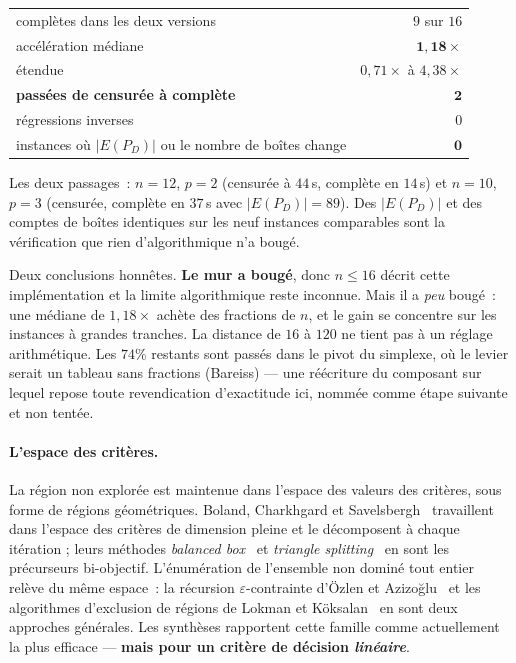 \documentclass[12pt,a4paper]{report}
\newcommand{\E}{E(P_D)}
\theoremstyle{plain}
\theoremstyle{definition}
\begin{document}
\begin{center}
\begin{tabular}{lr}
\toprule
complètes dans les deux versions                 & $9$ sur $16$ \\
\quad accélération médiane                       & $\mathbf{1{,}18\times}$ \\
\quad étendue                                    & $0{,}71\times$ à $4{,}38\times$ \\
\midrule
\textbf{passées de censurée à complète}          & $\mathbf{2}$ \\
régressions inverses                             & $0$ \\
\midrule
instances où $|\E|$ ou le nombre de boîtes change & $\mathbf{0}$ \\
\bottomrule
\end{tabular}
\end{center}

\noindent
Les deux passages~: $n{=}12$, $p{=}2$ (censurée à $44$\,s, complète en
$14$\,s) et $n{=}10$, $p{=}3$ (censurée, complète en $37$\,s avec
$|\E| = 89$).  Des $|\E|$ et des comptes de boîtes identiques sur les neuf
instances comparables sont la vérification que rien d'algorithmique n'a
bougé.

Deux conclusions honnêtes.  \textbf{Le mur a bougé}, donc $n \leqslant 16$
décrit cette implémentation et la limite algorithmique reste inconnue.  Mais
il a \emph{peu} bougé~: une médiane de $1{,}18\times$ achète des fractions de
$n$, et le gain se concentre sur les instances à grandes tranches.  La
distance de $16$ à $120$ ne tient pas à un réglage arithmétique.  Les $74\%$
restants sont passés dans le pivot du simplexe, où le levier serait un
tableau sans fractions (Bareiss) --- une réécriture du composant sur lequel
repose toute revendication d'exactitude ici, nommée comme étape suivante et
non tentée.

\paragraph{L'espace des critères.}
La région non explorée est maintenue dans l'espace des valeurs des critères,
sous forme de régions géométriques.  Boland, Charkhgard et
Savelsbergh~\cite{boland2017} travaillent dans l'espace des critères de
dimension pleine et le décomposent à chaque itération ; leurs méthodes
\emph{balanced box}~\cite{balancedbox} et \emph{triangle
splitting}~\cite{trianglesplitting} en sont les précurseurs bi-objectif.
L'énumération de l'ensemble non dominé tout entier relève du même espace~:
la récursion $\varepsilon$-contrainte d'Özlen et Azizoğlu~\cite{ozlen2009}
et les algorithmes d'exclusion de régions de Lokman et
Köksalan~\cite{lokman2013} en sont deux approches générales.  Les synthèses rapportent cette
famille comme actuellement la plus efficace --- \textbf{mais pour un critère de
décision \emph{linéaire}}.
\end{document}

